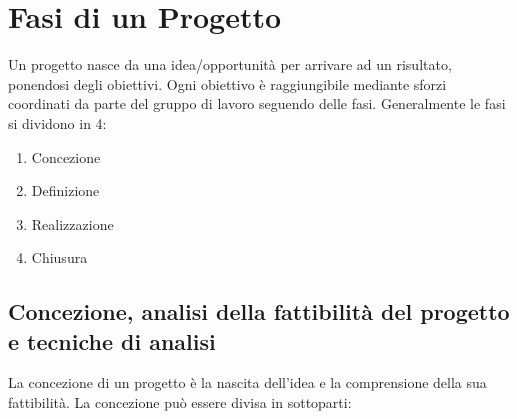 \documentclass{article}
\begin{document}
\section{Fasi di un Progetto}
Un progetto nasce da una idea/opportunità per arrivare ad un risultato, ponendosi degli obiettivi.
Ogni obiettivo è raggiungibile mediante sforzi coordinati da parte del gruppo di lavoro seguendo delle fasi.
Generalmente le fasi si dividono in 4:

\begin{enumerate}
\item Concezione
\item Definizione
\item Realizzazione
\item Chiusura	
\end{enumerate}

\subsection{Concezione, analisi della fattibilità del progetto e tecniche di analisi}
La concezione di un progetto è la nascita dell'idea e la comprensione della sua fattibilità.
La concezione può essere divisa in sottoparti:
\end{document}
